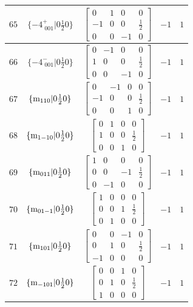\documentclass[fleqn,8pt]{jsarticle}
\begin{document}
\begin{longtable}{ccccc}
$ 65 $ & $ \{-4^{+}_{\,\,001}|0 \frac{1}{2} 0\} $ & $ \begin{bmatrix} 0 & 1 & 0 & 0 \\ -1 & 0 & 0 & \frac{1}{2} \\ 0 & 0 & -1 & 0 \end{bmatrix} $ & $ -1 $ & $ 1 $ \\ \hline
$ 66 $ & $ \{-4^{-}_{\,\,001}|0 \frac{1}{2} 0\} $ & $ \begin{bmatrix} 0 & -1 & 0 & 0 \\ 1 & 0 & 0 & \frac{1}{2} \\ 0 & 0 & -1 & 0 \end{bmatrix} $ & $ -1 $ & $ 1 $ \\ \hline
$ 67 $ & $ \{{\rm m}_{110}|0 \frac{1}{2} 0\} $ & $ \begin{bmatrix} 0 & -1 & 0 & 0 \\ -1 & 0 & 0 & \frac{1}{2} \\ 0 & 0 & 1 & 0 \end{bmatrix} $ & $ -1 $ & $ 1 $ \\ \hline
$ 68 $ & $ \{{\rm m}_{1-10}|0 \frac{1}{2} 0\} $ & $ \begin{bmatrix} 0 & 1 & 0 & 0 \\ 1 & 0 & 0 & \frac{1}{2} \\ 0 & 0 & 1 & 0 \end{bmatrix} $ & $ -1 $ & $ 1 $ \\ \hline
$ 69 $ & $ \{{\rm m}_{011}|0 \frac{1}{2} 0\} $ & $ \begin{bmatrix} 1 & 0 & 0 & 0 \\ 0 & 0 & -1 & \frac{1}{2} \\ 0 & -1 & 0 & 0 \end{bmatrix} $ & $ -1 $ & $ 1 $ \\ \hline
$ 70 $ & $ \{{\rm m}_{01-1}|0 \frac{1}{2} 0\} $ & $ \begin{bmatrix} 1 & 0 & 0 & 0 \\ 0 & 0 & 1 & \frac{1}{2} \\ 0 & 1 & 0 & 0 \end{bmatrix} $ & $ -1 $ & $ 1 $ \\ \hline
$ 71 $ & $ \{{\rm m}_{101}|0 \frac{1}{2} 0\} $ & $ \begin{bmatrix} 0 & 0 & -1 & 0 \\ 0 & 1 & 0 & \frac{1}{2} \\ -1 & 0 & 0 & 0 \end{bmatrix} $ & $ -1 $ & $ 1 $ \\ \hline
$ 72 $ & $ \{{\rm m}_{-101}|0 \frac{1}{2} 0\} $ & $ \begin{bmatrix} 0 & 0 & 1 & 0 \\ 0 & 1 & 0 & \frac{1}{2} \\ 1 & 0 & 0 & 0 \end{bmatrix} $ & $ -1 $ & $ 1 $ \\ \hline

\end{longtable}
\end{document}
